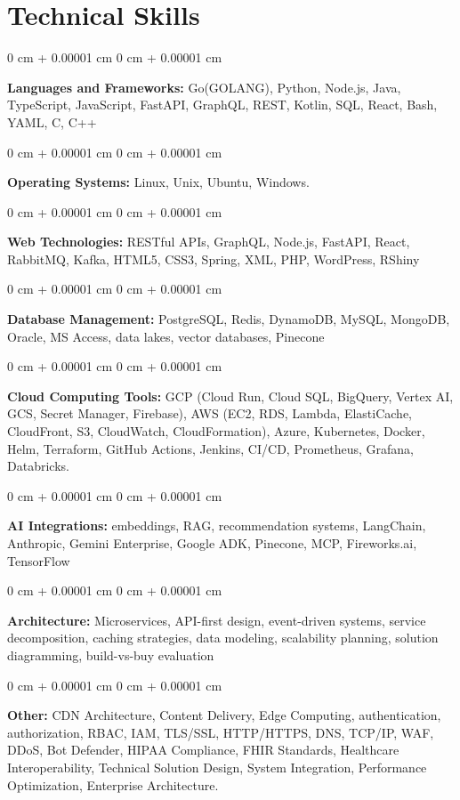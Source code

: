 \documentclass[10pt, letterpaper]{article}
\newenvironment{onecolentry}{
    \begin{adjustwidth}{
        0 cm + 0.00001 cm
    }{
        0 cm + 0.00001 cm
    }
}{
    \end{adjustwidth}
} %
\begin{document}
    \section{Technical Skills}
    \vspace{2 pt }
    \begin{onecolentry}
    \textbf{Languages and Frameworks:} Go(GOLANG), Python, Node.js, Java, TypeScript, JavaScript, FastAPI, GraphQL, REST, Kotlin, SQL, React, Bash, YAML, C, C++
    \end{onecolentry}
    \begin{onecolentry}
        \textbf{Operating Systems:} Linux, Unix, Ubuntu, Windows.
    \end{onecolentry}
    \begin{onecolentry}
         \textbf{Web Technologies:} RESTful APIs, GraphQL, Node.js, FastAPI, React, RabbitMQ, Kafka, HTML5, CSS3, Spring, XML, PHP, WordPress, RShiny \end{onecolentry}
    \begin{onecolentry}
        \textbf{Database Management:} PostgreSQL, Redis, DynamoDB, MySQL, MongoDB, Oracle, MS Access, data lakes, vector databases, Pinecone \end{onecolentry}
    \begin{onecolentry}
        \textbf{Cloud Computing Tools:}
GCP (Cloud Run, Cloud SQL, BigQuery, Vertex AI, GCS, Secret Manager, Firebase), AWS (EC2, RDS, Lambda, ElastiCache, CloudFront, S3, CloudWatch, CloudFormation), Azure, Kubernetes, Docker, Helm, Terraform, GitHub Actions, Jenkins, CI/CD, Prometheus, Grafana, Databricks.
    \end{onecolentry}
    \begin{onecolentry}
         \textbf{AI Integrations:} embeddings, RAG, recommendation systems, LangChain, Anthropic, Gemini Enterprise, Google ADK, Pinecone, MCP, Fireworks.ai, TensorFlow \end{onecolentry}
    \begin{onecolentry}
        \textbf{Architecture:} Microservices, API-first design, event-driven systems, service decomposition, caching strategies, data modeling, scalability planning, solution diagramming, build-vs-buy evaluation \end{onecolentry}
        \begin{onecolentry}
     \textbf{Other:} CDN Architecture, Content Delivery, Edge Computing, authentication, authorization, RBAC, IAM, TLS/SSL, HTTP/HTTPS, DNS, TCP/IP, WAF, DDoS, Bot Defender, HIPAA Compliance, FHIR Standards, Healthcare Interoperability, Technical Solution Design, System Integration, Performance Optimization, Enterprise Architecture.
    \end{onecolentry}
\end{document}
